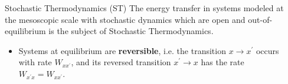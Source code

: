\documentclass[final]{beamer}
\newlength{\sepwidth}
\newlength{\colwidth}
\newcommand{\separatorcolumn}{\begin{column}{\sepwidth}\end{column}}
\begin{document}
\begin{frame}[t]
\begin{columns}[t]
\separatorcolumn

\begin{column}{\colwidth}


\begin{block}{Stochastic Thermodynamics (ST)}
\vskip10pt
%
%
%
\justifying
The energy transfer in systems modeled at the mesoscopic scale with stochastic dynamics which are open and out-of-equilibrium is the subject of Stochastic Thermodynamics\cite{peliti2021stochastic,Falasco:2023aa}. 
%
\begin{itemize}
\justifying
\item Systems at equilibrium are {\bf reversible}, i.e. the transition $x \rightarrow x^\prime$ occurs with rate $W_{xx^\prime}$, and its reversed transition $x^\prime \rightarrow x$ has the rate $W_{x^\prime x}=W_{xx^\prime}$.


\end{itemize}
\end{block}
\end{column}
\end{columns}
\end{frame}
\end{document}
